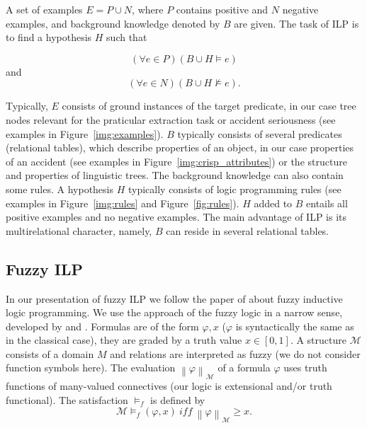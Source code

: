 \begin{definition}
A set of examples $E=P\cup N$, where $P$ contains positive and $N$ negative examples, and background knowledge denoted by $B$ are given. The task of ILP is to find a hypothesis $H$ such that 

$$
(\forall e\in P)(B\cup H\models e)
$$
and
$$
(\forall e\in N)(B\cup H\not\models e).
$$
\end{definition}
Typically, $E$ consists of ground instances of the target predicate, in our case tree nodes relevant for the praticular extraction task or accident seriousness (see examples in Figure~\ref{img:examples}). $B$ typically consists of several predicates (relational tables), which describe properties of an object, in our case properties of an accident (see examples in Figure~\ref{img:crisp_attributes}) or the structure and properties of linguistic trees. The background knowledge can also contain some rules. A hypothesis $H$ typically consists of logic programming rules (see examples in Figure~\ref{img:rules} and Figure~\ref{fig:rules}). $H$ added to $B$ entails all positive examples and no negative examples.
%
The main advantage of ILP is its multirelational character, namely, $B$ can reside in several relational tables.





\subsection{Fuzzy ILP}

In our presentation of fuzzy ILP we follow the paper of 
\cite{biblio:FILP} about fuzzy inductive logic programming.
We use the approach of the fuzzy logic in a narrow sense, developed by 
\cite{biblio:Pavelka} and 
\cite{biblio:Hajek}. Formulas are of the form $\varphi, x$ ($\varphi$ is syntactically the same as in the classical case), they are graded by a truth value $x\in [0,1]$.
A structure ${\mathcal M}$ consists of a domain $M$ and relations are interpreted as fuzzy (we do not consider function symbols here). The evaluation $\left\|\varphi\right\|_{{\mathcal M}}$ of a formula $\varphi$ uses truth functions of many-valued connectives (our logic is extensional and/or truth functional). The satisfaction $\models_f$ is defined by
$$
{\mathcal M}\models_f (\varphi, x)\ iff\ \left\|\varphi\right\|_{{\mathcal M}}\ge x.
$$

